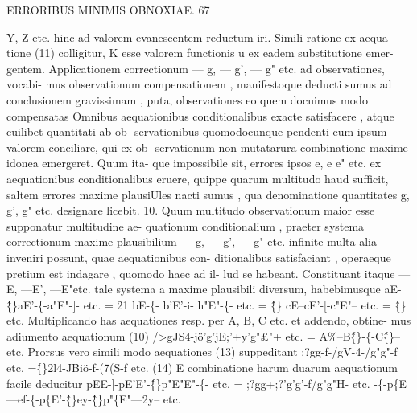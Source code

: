 \documentclass[12pt,a4paper]{article}
\begin{document}
\newpage
\begin{center}
\textsc{ERRORIBUS MINIMIS OBNOXIAE. 67}
\end{center}
Y, Z etc. hinc ad valorem evanescentem reductum iri. Simili ratione ex aequa-
tione (11) colligitur, K esse valorem functionis u ex eadem substitutione emer-
gentem.
Applicationem correctionum --- g, --- g', --- g" etc. ad observationes, vocabi-
mus ohservationum compensationem , manifestoque deducti sumus ad conclusionem
gravissimam , puta, observationes eo quem docuimus modo compensatas Omnibus
aequationibus conditionalibus exacte satisfacere , atque cuilibet quantitati ab ob-
servationibus quomodocunque pendenti eum ipsum valorem conciliare, qui ex ob-
servationum non mutatarura combinatione maxime idonea emergeret. Quum ita-
que impossibile sit, errores ipsos e, e e" etc. ex aequationibus conditionalibus
eruere, quippe quarum multitudo haud sufficit, saltem errores maxime plausiUles
nacti sumus , qua denominatione quantitates g, g', g" etc. designare licebit.
10.
Quum multitudo observationum maior esse supponatur multitudine ae-
quationum conditionalium , praeter systema correctionum maxime plausibilium
--- g, --- g', --- g" etc. infinite multa alia inveniri possunt, quae aequationibus con-
ditionalibus satisfaciant , operaeque pretium est indagare , quomodo haec ad il-
lud se habeant. Constituant itaque ---E, ---E', ---E"etc. tale systema a maxime
plausibili diversum, habebimusque
aE-\^\{\}aE'-\{-a"E"-]- etc. = 21
bE-\{- b'E'-i- h"E"-\{- etc. = \^\{\}
cE--cE'-[-c"E"-- etc. = \^\{\}
etc. Multiplicando has aequationes resp. per A, B, C etc. et addendo, obtine-
mus adiumento aequationum (10)
/>gJS4-jö'g'jE;'+y'g"£"+ etc. = A\%--B\^\{\}-\{-C\^\{\}-- etc.
Prorsus vero simili modo aequationes (13) suppeditant
;?gg-f-/gV-4-/g"g"-f etc. =\^\{\}2l4-JBiö-f-(7(S-f etc. (14)
E combinatione harum duarum aequationum facile deducitur
pEE-]-pE'E'-\^\{\}p"E"E"-\{- etc.
= ;?gg+;?'g'g'-f/g"g"H- etc. -\{-p\{E---ef-\{-p\{E'-\^\{\}ey-\^\{\}p"\{E"---2y-- etc.
\end{document}
